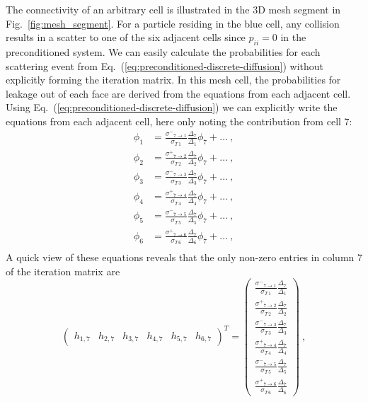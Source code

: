 \documentclass[preprint,12pt]{elsarticle}
\newcommand{\sigm}{\ensuremath{\sigma^{-}}}
\newcommand{\sigp}{\ensuremath{\sigma^{+}}}
\begin{document}
The connectivity of an arbitrary cell is illustrated in the 3D mesh segment in
Fig.~\ref{fig:mesh_segment}.  For a particle residing in the blue cell, any
collision results in a scatter to one of the six adjacent cells since
$p_{ii}=0$ in the preconditioned system.  We can easily calculate the
probabilities for each scattering event from
Eq.~(\ref{eq:preconditioned-discrete-diffusion}) without explicitly forming
the iteration matrix.  In this mesh cell, the probabilities for leakage out of
each face are derived from the equations from each adjacent cell.  Using
Eq.~(\ref{eq:preconditioned-discrete-diffusion}) we can explicitly write the
equations from each adjacent cell, here only noting the contribution from cell
7:
\begin{align*}
  \phi_1 &= \frac{\sigm_{7\rightarrow
      1}}{\sigma_{T\,1}}\frac{\Delta_7}{\Delta_1}\phi_7 +
  \ldots\:,\\ \phi_2 &= \frac{\sigp_{7\rightarrow 2}}
          {\sigma_{T\,2}}\frac{\Delta_7}{\Delta_2}\phi_7 + \ldots\:,\\ 
      \phi_3 &= \frac{\sigm_{7\rightarrow
          3}}{\sigma_{T\,3}}\frac{\Delta_7}{\Delta_3}\phi_7 +
      \ldots\:,\\  \phi_4 &= \frac{\sigp_{7\rightarrow
      4}}{\sigma_{T\,4}}\frac{\Delta_7}{\Delta_4}\phi_7 +
          \ldots\:,\\  \phi_5 &= \frac{\sigm_{7\rightarrow
          5}}{\sigma_{T\,5}}\frac{\Delta_7}{\Delta_5}\phi_7 +
              \ldots\:,\\  \phi_6 &= \frac{\sigp_{7\rightarrow
              6}}{\sigma_{T\,6}}\frac{\Delta_7}{\Delta_6}\phi_7 +
                  \ldots\:,\\ 
\end{align*} 
A quick view of these equations reveals that the only non-zero entries in
column 7 of the iteration matrix are
\begin{equation*}
  \begin{pmatrix}
    h_{1,7} & h_{2,7} & h_{3,7} & h_{4,7} & h_{5,7} & h_{6,7}
  \end{pmatrix}^{T}
  =
  \begin{pmatrix}
    \frac{\sigm_{7\rightarrow
        1}}{\sigma_{T\,1}}\frac{\Delta_7}{\Delta_1}
    \\ \frac{\sigp_{7\rightarrow
        2}}{\sigma_{T\,2}}\frac{\Delta_7}{\Delta_2}
    \\ \frac{\sigm_{7\rightarrow
        3}}{\sigma_{T\,3}}\frac{\Delta_7}{\Delta_3}
    \\ \frac{\sigp_{7\rightarrow
        4}}{\sigma_{T\,4}}\frac{\Delta_7}{\Delta_4}
    \\ \frac{\sigm_{7\rightarrow
        5}}{\sigma_{T\,5}}\frac{\Delta_7}{\Delta_5}
    \\ \frac{\sigp_{7\rightarrow
        6}}{\sigma_{T\,6}}\frac{\Delta_7}{\Delta_6}
  \end{pmatrix}\:,
\end{equation*}
\end{document}
